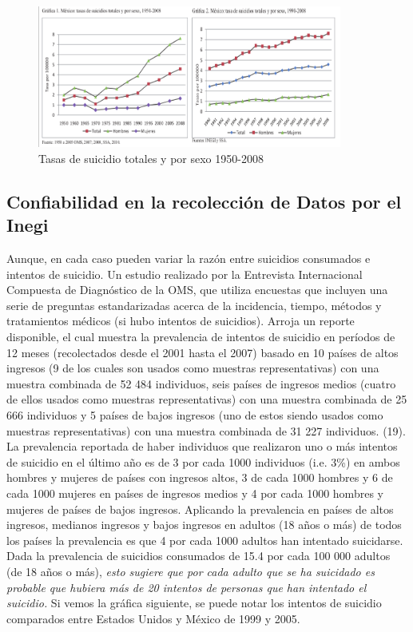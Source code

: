 {\begin{figure}[hbtp]
\centering
\includegraphics[width=10cm]{imagenes/1-suicidio/grafica1.png}
\caption{Tasas de suicidio totales y por sexo 1950-2008}
\end{figure}


\subsection{Confiabilidad en la recolección de Datos por el Inegi}
{
Aunque, en cada caso pueden variar la razón entre suicidios consumados e intentos de suicidio. Un estudio realizado por la Entrevista Internacional Compuesta de Diagnóstico de la OMS, que utiliza encuestas que incluyen una serie de preguntas estandarizadas acerca de la incidencia,  tiempo, métodos y tratamientos médicos (si hubo intentos de suicidios). Arroja un reporte disponible, el cual muestra la prevalencia de intentos de suicidio en períodos de 12 meses (recolectados desde el 2001 hasta el 2007) basado en 10 países de altos ingresos (9 de los cuales son usados como muestras representativas) con una muestra combinada de 52 484 individuos, seis países de ingresos medios (cuatro de ellos usados como muestras representativas) con una muestra combinada de 25 666 individuos y 5 países de bajos ingresos (uno de estos siendo usados como muestras representativas) con una muestra combinada de 31 227 individuos. (19). La prevalencia reportada de haber individuos que realizaron uno o más intentos de suicidio en el último año es de 3 por cada 1000 individuos (i.e. 3\%) en ambos hombres y mujeres de países con ingresos altos, 3 de cada 1000  hombres y 6 de cada 1000  mujeres en países de ingresos medios y 4 por cada 1000 hombres y mujeres de países de bajos ingresos. Aplicando la prevalencia en países de altos ingresos, medianos ingresos y bajos ingresos en adultos (18 años o más) de todos los países la prevalencia es que 4 por cada 1000 adultos han intentado suicidarse. Dada la prevalencia de suicidios consumados de 15.4 por cada 100 000 adultos (de 18 años o más), \emph{esto sugiere que por cada adulto que se ha suicidado es probable que hubiera más de 20 intentos de personas que han intentado el suicidio.}
\linebreak
\linebreak
Si vemos la gráfica siguiente, se puede notar los intentos de suicidio comparados entre Estados Unidos y México de 1999 y 2005.

}}
